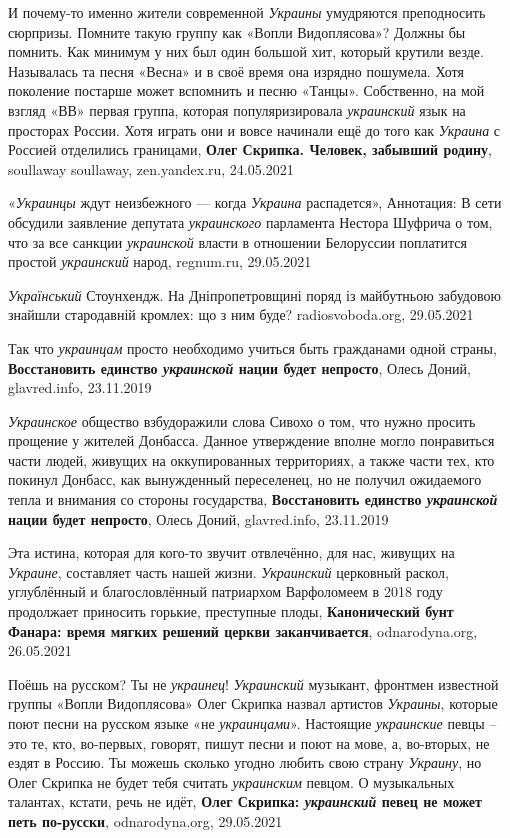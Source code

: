 И почему-то именно жители современной \emph{Украины} умудряются преподносить
сюрпризы.  Помните такую группу как «Вопли Видоплясова»? Должны бы помнить. Как
минимум у них был один большой хит, который крутили везде. Называлась та песня
«Весна» и в своё время она изрядно пошумела. Хотя поколение постарше может
вспомнить и песню «Танцы». Собственно, на мой взгляд «ВВ» первая группа,
которая популяризировала \emph{украинский} язык на просторах России. Хотя
играть они и вовсе начинали ещё до того как \emph{Украина} с Россией отделились
границами, \textbf{Олег Скрипка. Человек, забывший родину}, soullaway
soullaway, zen.yandex.ru, 24.05.2021

«\emph{Украинцы} ждут неизбежного — когда \emph{Украина} распадется», Аннотация: В сети
обсудили заявление депутата \emph{украинского} парламента Нестора Шуфрича о том, что
за все санкции \emph{украинской} власти в отношении Белоруссии поплатится простой
\emph{украинский} народ, regnum.ru, 29.05.2021

\emph{Український} Стоунхендж. На Дніпропетровщині поряд із майбутньою забудовою
знайшли стародавній кромлех: що з ним буде? radiosvoboda.org, 29.05.2021

Так что \emph{украинцам} просто необходимо учиться быть гражданами одной
страны, \textbf{Восстановить единство \emph{украинской} нации будет непросто},
Олесь Доний, glavred.info, 23.11.2019

\emph{Украинское} общество взбудоражили слова Сивохо о том, что нужно просить
прощение у жителей Донбасса. Данное утверждение вполне могло понравиться части
людей, живущих на оккупированных территориях, а также части тех, кто покинул
Донбасс, как вынужденный переселенец, но не получил ожидаемого тепла и внимания
со стороны государства, \textbf{Восстановить единство \emph{украинской} нации
будет непросто}, Олесь Доний, glavred.info, 23.11.2019

Эта истина, которая для кого-то звучит отвлечённо, для нас, живущих на
\emph{Украине}, составляет часть нашей жизни. \emph{Украинский} церковный
раскол, углублённый и благословлённый патриархом Варфоломеем в 2018 году
продолжает приносить горькие, преступные плоды, \textbf{Канонический бунт
Фанара: время мягких решений церкви заканчивается}, odnarodyna.org, 26.05.2021

Поёшь на русском? Ты не \emph{украинец}! \emph{Украинский} музыкант, фронтмен
известной группы «Вопли Видоплясова» Олег Скрипка назвал артистов
\emph{Украины}, которые поют песни на русском языке «не \emph{украинцами}».
Настоящие \emph{украинские} певцы – это те, кто, во-первых, говорят, пишут
песни и поют на мове, а, во-вторых, не ездят в Россию. Ты можешь сколько угодно
любить свою страну \emph{Украину}, но Олег Скрипка не будет тебя считать
\emph{украинским} певцом. О музыкальных талантах, кстати, речь не идёт,
\textbf{Олег Скрипка: \emph{украинский} певец не может петь по-русски},
odnarodyna.org, 29.05.2021

